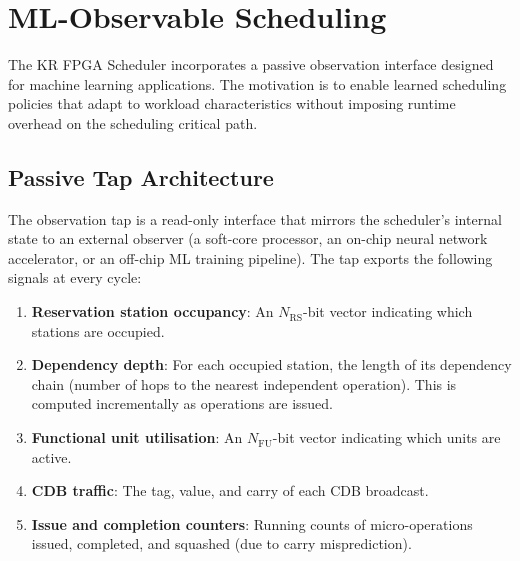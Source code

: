 \documentclass[11pt,a4paper]{article}
\begin{document}
\section{ML-Observable Scheduling}
\label{sec:ml}

The KR FPGA Scheduler incorporates a passive observation interface designed
for machine learning applications.  The motivation is to enable learned
scheduling policies that adapt to workload characteristics without imposing
runtime overhead on the scheduling critical path.

\subsection{Passive Tap Architecture}
\label{sec:passive-tap}

The observation tap is a read-only interface that mirrors the scheduler's
internal state to an external observer (a soft-core processor, an on-chip
neural network accelerator, or an off-chip ML training pipeline).  The
tap exports the following signals at every cycle:

\begin{enumerate}[leftmargin=*]
  \item \textbf{Reservation station occupancy}: An $N_{\mathrm{RS}}$-bit
    vector indicating which stations are occupied.

  \item \textbf{Dependency depth}: For each occupied station, the length
    of its dependency chain (number of hops to the nearest independent
    operation).  This is computed incrementally as operations are issued.

  \item \textbf{Functional unit utilisation}: An $N_{\mathrm{FU}}$-bit
    vector indicating which units are active.

  \item \textbf{CDB traffic}: The tag, value, and carry of each CDB
    broadcast.

  \item \textbf{Issue and completion counters}: Running counts of
    micro-operations issued, completed, and squashed (due to carry
    misprediction).
\end{enumerate}
\end{document}
